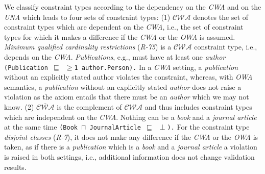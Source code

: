 \documentclass{acm_proc_article-sp}
\newcommand{\ms}[1]{%
  \texttt{#1}
}
\begin{document}
We classify constraint types according to the dependency on the \emph{CWA} and on the \emph{UNA} which leads to four sets of constraint types:
(1) $\mathcal{CWA}$ denotes the set of constraint types which are dependent on the \emph{CWA},
	i.e., the set of constraint types for which it makes a difference if the \emph{CWA} or the \emph{OWA} is assumed.
{\em Minimum qualified cardinality restrictions} (\emph{R-75}) is a $\mathcal{CWA}$ constraint type, i.e., depends on the \emph{CWA}.
\emph{Publications}, e.g., must have at least one \emph{author} {\small\ms{(Publication $\sqsubseteq$ $\geq$1 author.Person).}}
In a \emph{CWA} setting, a \emph{publication} without an explicitly stated author violates the constraint, 
whereas, with \emph{OWA} semantics, 
a \emph{publication} without an explicitly stated \emph{author} does not raise a violation 
as the axiom entails that there must be an \emph{author} which we may not know.
(2) $\overline{\mathcal{CWA}}$ is the complement of $\mathcal{CWA}$ and thus includes constraint types which are independent on the \emph{CWA}.
Nothing can be a \emph{book} and a \emph{journal article}  at the same time {\small\ms{(Book $\sqcap$ JournalArticle $\sqsubseteq$ $\perp$).}}
For the constraint type {\em disjoint classes} (\emph{R-7}), it does not make any difference if the \emph{CWA} or the \emph{OWA} is taken,
as if there is a \emph{publication} which is a \emph{book} and a \emph{journal article} a violation is raised in both settings,
i.e., additional information does not change validation results.

\end{document}
